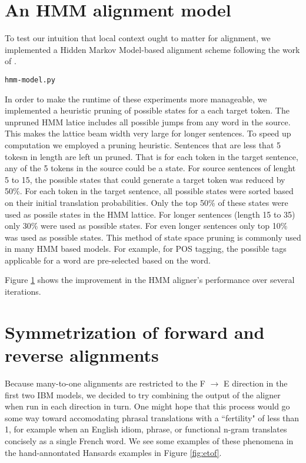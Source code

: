 \documentclass{article}
\begin{document}
\section{An HMM alignment model}

To test our intuition that local context ought to matter for alignment, we implemented a Hidden Markov Model-based alignment scheme following the work of \cite{todo}.

{\tt hmm-model.py}

In order to make the runtime of these experiments more manageable, we implemented a heuristic pruning of possible states for a each target token. The unpruned HMM latice includes all possible jumps from any word in the source. This makes the lattice beam width very large for longer sentences. To speed up computation we employed a pruning heuristic. Sentences that are less that 5 tokesn in length are left un pruned. That is for each token in the target sentence, any of the 5 tokens in the source could be a state. For source sentences of lenght 5 to 15, the possible states that could generate a target token was reduced by 50\%. For each token in the target sentence, all possible states were sorted based on their initial translation probabilities. Only the top 50\% of these states were used as possile states in the HMM lattice. For longer sentences (length 15 to 35) only 30\% were used as possible states. For even longer sentences only top 10\% was used as possible states. This method of state space pruning is commonly used in many HMM based models. For example, for POS tagging, the possible tags applicable for a word are pre-selected based on the word. 

Figure \ref{fig:hmm_learning_curve} shows the improvement in the HMM aligner's performance over several iterations.

\begin{figure}
\begin{center}
\end{center}
\label{fig:hmm_learning_curve}
\end{figure}

\section{Symmetrization of forward and reverse alignments}

Because many-to-one alignments are restricted to the F $\rightarrow$ E direction in the first two IBM models, we decided to try combining the output of the aligner when run in each direction in turn. One might hope that this process would go some way toward accomodating phrasal translations with a ``fertility" of less than 1, for example when an English idiom, phrase, or functional n-gram translates concisely as a single French word. We see some examples of these phenomena in the hand-annontated Hansards examples in Figure \ref{fig:etof}.
\end{document}
